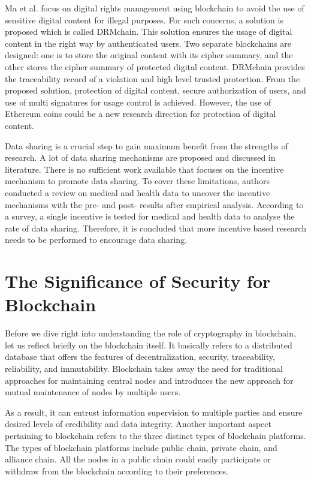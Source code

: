 \documentclass[BTech]{srmuthesis}
\begin{document}
 Ma et al. focus on digital rights management using blockchain to avoid the use of sensitive digital content for illegal purposes. For such concerns, a solution is proposed which is called DRMchain. This solution ensures the usage of digital content in the right way by authenticated users. Two separate blockchains are designed: one is to store the original content with its cipher summary, and the other stores the cipher summary of protected digital content. DRMchain provides the traceability record of a violation and high level trusted protection. From the proposed solution, protection of digital content, secure authorization of users, and use of multi signatures for usage control is achieved. However, the use of Ethereum coins could be a new research direction for protection of digital content.

 Data sharing is a crucial step to gain maximum benefit from the strengths of research. A lot of data sharing mechanisms are proposed and discussed in literature. There is no sufficient work available that focuses on the incentive mechanism to promote data sharing. To cover these limitations, authors conducted a review on medical and health data to uncover the incentive mechanisms with the pre- and post- results after empirical analysis. According to a survey, a single incentive is tested for medical and health data to analyse the rate of data sharing. Therefore, it is concluded that more incentive based research needs to be performed to encourage data sharing. 

 \section{The Significance of Security for Blockchain }
 Before we dive right into understanding the role of cryptography in blockchain, let us reflect briefly on the blockchain itself. It basically refers to a distributed database that offers the features of decentralization, security, traceability, reliability, and immutability. Blockchain takes away the need for traditional approaches for maintaining central nodes and introduces the new approach for mutual maintenance of nodes by multiple users. 

 As a result, it can entrust information supervision to multiple parties and ensure desired levels of credibility and data integrity. Another important aspect pertaining to blockchain refers to the three distinct types of blockchain platforms. The types of blockchain platforms include public chain, private chain, and alliance chain. All the nodes in a public chain could easily participate or withdraw from the blockchain according to their preferences. 
\end{document}
